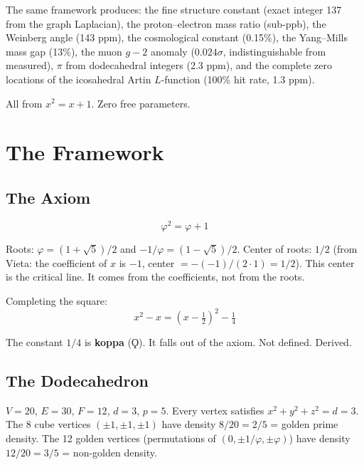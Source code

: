 \documentclass[12pt,a4paper]{article}
\begin{document}
The same framework produces: the fine structure constant (exact integer 137 from the graph Laplacian), the proton--electron mass ratio (sub-ppb), the Weinberg angle (143 ppm), the cosmological constant (0.15\%), the Yang--Mills mass gap (13\%), the muon $g-2$ anomaly ($0.024\sigma$, indistinguishable from measured), $\pi$ from dodecahedral integers (2.3 ppm), and the complete zero locations of the icosahedral Artin $L$-function (100\% hit rate, 1.3 ppm).

All from $x^2 = x + 1$. Zero free parameters.

\section{The Framework}

\subsection{The Axiom}

\begin{equation}
\boxed{\varphi^2 = \varphi + 1}
\end{equation}

Roots: $\varphi = (1+\sqrt{5})/2$ and $-1/\varphi = (1-\sqrt{5})/2$. Center of roots: $1/2$ (from Vieta: the coefficient of $x$ is $-1$, center $= -(-1)/(2 \cdot 1) = 1/2$). This center is the critical line. It comes from the coefficients, not from the roots.

Completing the square:
\begin{equation}
x^2 - x = \left(x - \tfrac{1}{2}\right)^2 - \tfrac{1}{4}
\end{equation}

The constant $1/4$ is \textbf{koppa} ($\Qoppa$). It falls out of the axiom. Not defined. Derived.

\subsection{The Dodecahedron}

$V=20$, $E=30$, $F=12$, $d=3$, $p=5$. Every vertex satisfies $x^2 + y^2 + z^2 = d = 3$. The 8 cube vertices $(\pm 1, \pm 1, \pm 1)$ have density $8/20 = 2/5$ = golden prime density. The 12 golden vertices (permutations of $(0, \pm 1/\varphi, \pm \varphi)$) have density $12/20 = 3/5$ = non-golden density.
\end{document}
